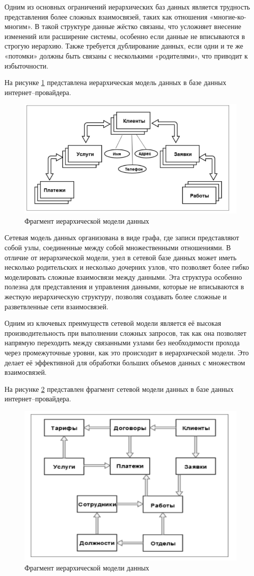 Одним из основных ограничений иерархических баз данных является трудность представления более сложных взаимосвязей, таких как отношения «многие-ко-многим». В такой структуре данные жёстко связаны, что усложняет внесение изменений или расширение системы, особенно если данные не вписываются в строгую иерархию. Также требуется дублирование данных, если одни и те же «потомки» должны быть связаны с несколькими «родителями», что приводит к избыточности.

На рисунке \ref{img:1_model} представлена иерархическая модель данных в базе данных интернет--провайдера.
\begin{figure}[ht!]
	\centering
	\includegraphics[width=0.55\linewidth]{img/2.png}
	\caption{Фрагмент иерархической модели данных}
	\label{img:1_model}
\end{figure}

Сетевая модель данных организована в виде графа, где записи представляют собой узлы, соединенные между собой множественными отношениями. В отличие от иерархической модели, узел в сетевой базе данных может иметь несколько родительских и несколько дочерних узлов, что позволяет более гибко моделировать сложные взаимосвязи между данными. Эта структура особенно полезна для представления и управления данными, которые не вписываются в жесткую иерархическую структуру, позволяя создавать более сложные и разветвленные сети взаимосвязей. \cite{csharp}

Одним из ключевых преимуществ сетевой модели является её высокая производительность при выполнении сложных запросов, так как она позволяет напрямую переходить между связанными узлами без необходимости прохода через промежуточные уровни, как это происходит в иерархической модели. Это делает её эффективной для обработки больших объемов данных с множеством взаимосвязей.

На рисунке \ref{img:2_model} представлен фрагмент сетевой модели данных в базе данных интернет--провайдера.
\begin{figure}[ht!]
	\centering
	\includegraphics[width=0.55\linewidth]{img/3.png}
	\caption{Фрагмент иерархической модели данных}
	\label{img:2_model}
\end{figure}

